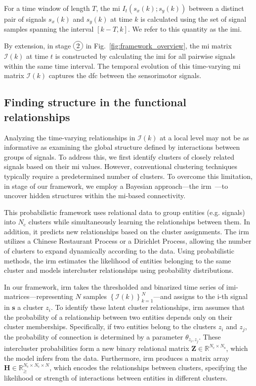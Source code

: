 \documentclass[letterpaper, 10 pt, conference]{ieeeconf}  %
\newcommand*\circled[1]{\tikz[baseline=(char.base)]{
            \node[shape=circle,draw,inner sep=2pt] (char) {#1};}}
\begin{document}
For a time window of length $T$, the \ac{mi} $I_t(s_x(k);s_y(k))$ between a distinct pair of signals $s_x(k)$ and $s_y(k)$ at time $k$ is calculated using the set of signal samples spanning the interval $\left[k-T,k\right]$. We refer to this quantity as the \acf{imi}. 

By extension, in stage $\circled{2}$ in Fig.~\ref{fig:framework_overview}, the \ac{mi} matrix $\bm{\mathcal{I}}(k)$ at time $t$ is constructed by calculating the \ac{imi} for all pairwise signals within the same time interval. The temporal evolution of this time-varying \ac{mi} matrix $\bm{\mathcal{I}}(k)$ captures the \ac{dfc} between the sensorimotor signals.

\subsection{Finding structure in the functional relationships}\label{sec:the_irm}
Analyzing the time-varying relationships in $\bm{\mathcal{I}}(k)$ at a local level may not be as informative as examining the global structure defined by interactions between groups of signals. To address this, we first identify clusters of closely related signals based on their \ac{mi} values. However, conventional clustering techniques typically require a predetermined number of clusters. To overcome this limitation, in stage \circled{3} of our framework, we employ a Bayesian approach---the \ac{irm}~\cite{Moerup2012}---to uncover hidden structures within the \ac{mi}-based connectivity.

This probabilistic framework uses relational data to group entities (e.g. signals) into $N_\text{c}$ clusters while simultaneously learning the relationships between them. In addition, it predicts new relationships based on the cluster assignments. The \ac{irm} utilizes a Chinese Restaurant Process or a Dirichlet Process, allowing the number of clusters to expand dynamically according to the data. Using probabilistic methods, the \ac{irm} estimates the likelihood of entities belonging to the same cluster and models intercluster relationships using probability distributions.

In our framework, \ac{irm} takes the thresholded and binarized time series of \ac{imi}-matrices---representing $N$ samples $\left\lbrace \bm{\mathcal{I}}(k)\right\rbrace^{N}_{k=1}$---and assigns to the i-th signal in $\bm{s}$ a cluster $z_i$. To identify these latent cluster relationships, \ac{irm} assumes that the probability of a relationship between two entities depends only on their cluster memberships. Specifically, if two entities belong to the clusters $z_i$ and $z_j$, the probability of connection is determined by a parameter $\theta_{z_i,z_j}$. These intercluster probabilities form a new binary relational matrix $\bm{Z}\in \mathbb{R}^{N_\text{c}\times N_\text{s}}$, which the model infers from the data. Furthermore, \ac{irm} produces a matrix array $\bm{H}\in \mathbb{R}^{N_\text{c}\times N_\text{c} \times N}_{\geq}$, which encodes the relationships between clusters, specifying the likelihood or strength of interactions between entities in different clusters.
\end{document}
